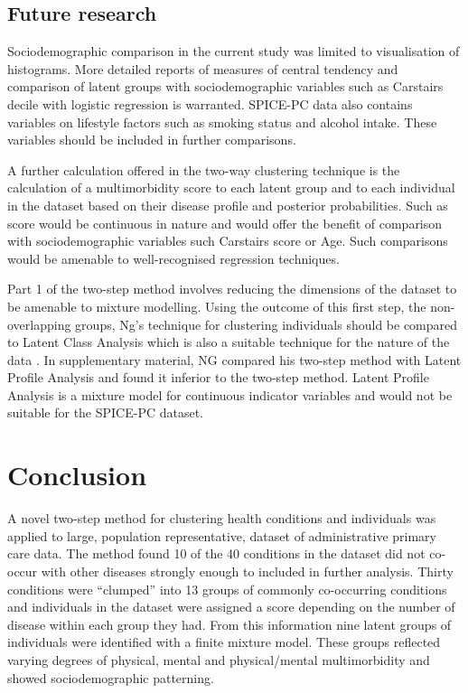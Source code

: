 \documentclass[12pt,]{report}
\begin{document}
\subsection{Future research}\label{subsec:clust-future}

Sociodemographic comparison in the current study was limited to
visualisation of histograms. More detailed reports of measures of
central tendency and comparison of latent groups with sociodemographic
variables such as Carstairs decile with logistic regression is
warranted. SPICE-PC data also contains variables on lifestyle factors
such as smoking status and alcohol intake. These variables should be
included in further comparisons.

A further calculation offered in the two-way clustering technique
\citep{RN72} is the calculation of a multimorbidity score to each latent
group and to each individual in the dataset based on their disease
profile and posterior probabilities. Such as score would be continuous
in nature and would offer the benefit of comparison with
sociodemographic variables such Carstairs score or Age. Such comparisons
would be amenable to well-recognised regression techniques.

Part 1 of the two-step method involves reducing the dimensions of the
dataset to be amenable to mixture modelling. Using the outcome of this
first step, the non-overlapping groups, Ng's technique for clustering
individuals should be compared to Latent Class Analysis which is also a
suitable technique for the nature of the data \citep{RN291}. In
supplementary material, NG \citeyearpar{RN72} compared his two-step
method with Latent Profile Analysis and found it inferior to the
two-step method. Latent Profile Analysis is a mixture model for
continuous indicator variables \citep{RN291} and would not be suitable
for the SPICE-PC dataset.

\section{Conclusion}\label{sec:clust-conclusion}

A novel two-step method for clustering health conditions and individuals
was applied to large, population representative, dataset of
administrative primary care data. The method found 10 of the 40
conditions in the dataset did not co-occur with other diseases strongly
enough to included in further analysis. Thirty conditions were
``clumped'' into 13 groups of commonly co-occurring conditions and
individuals in the dataset were assigned a score depending on the number
of disease within each group they had. From this information nine latent
groups of individuals were identified with a finite mixture model. These
groups reflected varying degrees of physical, mental and physical/mental
multimorbidity and showed sociodemographic patterning.
\end{document}
